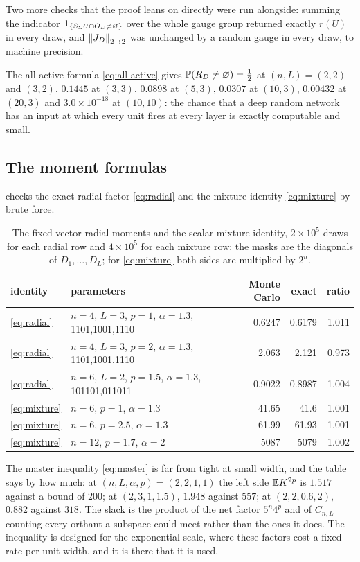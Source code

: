 Two more checks that the proof leans on directly were run alongside: summing the indicator $\mathbf{1}_{\{S_\Sigma U\cap O_D\ne\varnothing\}}$ over the whole gauge group returned exactly $r(U)$ in every draw, and $\left\lVert J_D\right\rVert_{2\to 2}$ was unchanged by a random gauge in every draw, to machine precision.

The all-active formula \cref{eq:all-active} gives $\mathbb{P}(R_D\ne\varnothing)=\tfrac12$ at $(n,L)=(2,2)$ and $(3,2)$, $0.1445$ at $(3,3)$, $0.0898$ at $(5,3)$, $0.0307$ at $(10,3)$, $0.00432$ at $(20,3)$ and $3.0\times10^{-18}$ at $(10,10)$: the chance that a deep random network has an input at which every unit fires at every layer is exactly computable and small.

\subsection{The moment formulas}

 checks the exact radial factor \cref{eq:radial} and the mixture identity \cref{eq:mixture} by brute force.

\begin{table}[h]\centering\small
\begin{tabular}{llrrr}
\toprule
identity & parameters & Monte Carlo & exact & ratio\\
\midrule
\cref{eq:radial} & $n=4$, $L=3$, $p=1$, $\alpha=1.3$, 1101,1001,1110 & 0.6247 & 0.6179 & 1.011\\
\cref{eq:radial} & $n=4$, $L=3$, $p=2$, $\alpha=1.3$, 1101,1001,1110 & 2.063 & 2.121 & 0.973\\
\cref{eq:radial} & $n=6$, $L=2$, $p=1.5$, $\alpha=1.3$, 101101,011011 & 0.9022 & 0.8987 & 1.004\\
\cref{eq:mixture} & $n=6$, $p=1$, $\alpha=1.3$ & 41.65 & 41.6 & 1.001\\
\cref{eq:mixture} & $n=6$, $p=2.5$, $\alpha=1.3$ & 61.99 & 61.93 & 1.001\\
\cref{eq:mixture} & $n=12$, $p=1.7$, $\alpha=2$ & 5087 & 5079 & 1.002\\
\bottomrule
\end{tabular}
\caption{The fixed-vector radial moments and the scalar mixture identity, $2\times10^5$ draws for each radial row and $4\times10^5$ for each mixture row; the masks are the diagonals of $D_1,\dots,D_L$; for \cref{eq:mixture} both sides are multiplied by $2^n$.}
\label{tab:radial}
\end{table}

The master inequality \cref{eq:master} is far from tight at small width, and the table says by how much: at $(n,L,\alpha,p)=(2,2,1,1)$ the left side $\mathbb{E} K^{2p}$ is $1.517$ against a bound of $200$; at $(2,3,1,1.5)$, $1.948$ against $557$; at $(2,2,0.6,2)$, $0.882$ against $318$. The slack is the product of the net factor $5^n4^p$ and of $C_{n,L}$ counting every orthant a subspace could meet rather than the ones it does. The inequality is designed for the exponential scale, where these factors cost a fixed rate per unit width, and it is there that it is used.


